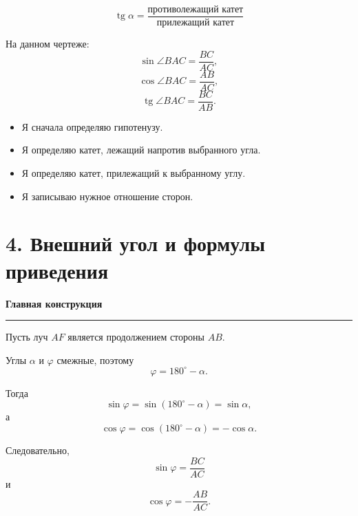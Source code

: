 \documentclass[a4paper,12pt]{article}
\DeclareMathOperator{\tg}{tg}
\newcommand{\checkitem}{\item[$\square$]}
\newcommand{\accentline}{%
    \vspace{0.2em}
    {\color{accent}\rule{\linewidth}{0.6pt}}
    \vspace{0.5em}
}
\newcommand{\topic}[1]{%
    \vspace{0.5em}
    {\large\bfseries\color{darkaccent}#1}\par
    \accentline
}
\begin{document}
\[
\boxed{
\tg\alpha=
\frac{\text{противолежащий катет}}
     {\text{прилежащий катет}}
}
\]

На данном чертеже:
\[
\sin\angle BAC=\frac{BC}{AC},
\]
\[
\cos\angle BAC=\frac{AB}{AC},
\]
\[
\tg\angle BAC=\frac{BC}{AB}.
\]

\begin{itemize}
\checkitem Я сначала определяю гипотенузу.
\checkitem Я определяю катет, лежащий напротив выбранного угла.
\checkitem Я определяю катет, прилежащий к выбранному углу.
\checkitem Я записываю нужное отношение сторон.
\end{itemize}


\section*{\color{darkaccent}4. Внешний угол и формулы приведения}

\topic{Главная конструкция}

Пусть луч $AF$ является продолжением стороны $AB$.

\begin{center}
\end{center}

Углы $\alpha$ и $\varphi$ смежные, поэтому
\[
\varphi=180^\circ-\alpha.
\]

Тогда
\[
\sin\varphi
=
\sin(180^\circ-\alpha)
=
\sin\alpha,
\]
а
\[
\cos\varphi
=
\cos(180^\circ-\alpha)
=
-\cos\alpha.
\]

Следовательно,
\[
\boxed{
\sin\varphi=\frac{BC}{AC}
}
\]
и
\[
\boxed{
\cos\varphi=-\frac{AB}{AC}
}.
\]
\end{document}
